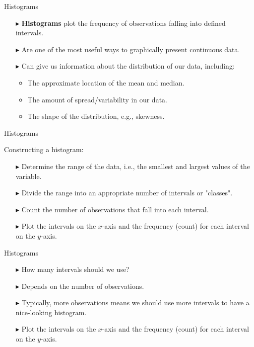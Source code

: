 \documentclass[12pt]{beamer}
\begin{document}
\begin{frame}{Histograms}
	\begin{itemize}
		\item[$\blacktriangleright$] {\bf Histograms} plot the frequency of observations falling into defined intervals.
		\item[$\blacktriangleright$] Are one of the most useful ways to graphically present continuous data.
		\item[$\blacktriangleright$] Can give us information about the distribution of our data, including:
		\begin{itemize}
		\item The approximate location of the mean and median.
		\item The amount of spread/variability in our data.
		\item The shape of the distribution, e.g., skewness.
	    \end{itemize}
	\end{itemize}
\end{frame}
\begin{frame}{Histograms}
	
	Constructing a histogram:
	\begin{itemize}
		\item[$\blacktriangleright$] Determine the range of the data, i.e., the smallest and largest values of the variable.
		\item[$\blacktriangleright$] Divide the range into an appropriate number of intervals or "classes".
		\item[$\blacktriangleright$] Count the number of observations that fall into each interval.
		\item[$\blacktriangleright$] Plot the intervals on the $x$-axis and the frequency (count) for each interval on the $y$-axis.
	\end{itemize}
\end{frame}
\begin{frame}{Histograms}
	
	\begin{itemize}
		\item[$\blacktriangleright$] How many intervals should we use?
		\item[$\blacktriangleright$] Depends on the number of observations.
		\item[$\blacktriangleright$] Typically, more observations means we should use more intervals to have a nice-looking histogram.
		\item[$\blacktriangleright$] Plot the intervals on the $x$-axis and the frequency (count) for each interval on the $y$-axis.
	\end{itemize}
\end{frame}
\end{document}
